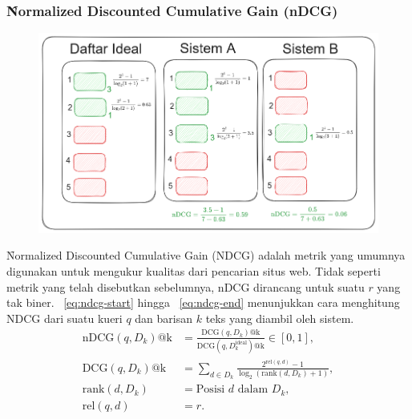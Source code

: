     \subsubsection{\f{Normalized Discounted Cumulative Gain} (nDCG)}

        \begin{figure}[!ht]
            \centering
            \includegraphics[width=1\textwidth]{assets/pics/contohnDCG.png}
            \label{fig:ndcg}
        \end{figure}
        \f{Normalized Discounted Cumulative Gain} (NDCG) adalah metrik yang umumnya digunakan untuk mengukur kualitas dari pencarian situs web. Tidak seperti metrik yang telah disebutkan sebelumnya, nDCG dirancang untuk suatu $r$ yang tak biner. \equ~\ref{eq:ndcg-start} hingga \equ~\ref{eq:ndcg-end} menunjukkan cara menghitung NDCG dari suatu kueri $q$ dan barisan $k$ teks yang diambil oleh sistem.
        \begin{align}
            \label{eq:ndcg-start}
            \text{nDCG}(q, D_k)\text{@k} &= \frac{\text{DCG}(q, D_k)\text{@k}}{\text{DCG}(q, D_k^{\text{ideal}})\text{@k}} \in [0, 1], \\
            \label{eq:dcg}
            \text{DCG}(q, D_k)\text{@k} &= \sum_{d \in D_k} \frac{2^{\text{rel}(q, d)} - 1}{\log_2(\text{rank}(d, D_k) + 1)}, \\
            \text{rank}(d,D_k) &= \text{Posisi } d \text{ dalam } D_k, \\
            \text{rel}(q, d) &= r.
            \label{eq:ndcg-end}
        \end{align}

